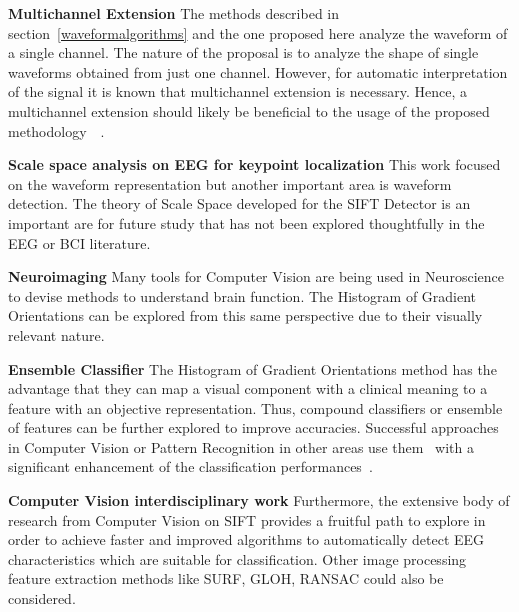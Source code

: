 \textbf{Multichannel Extension}
The methods described in section~\ref{waveformalgorithms} and the one proposed here analyze the waveform of a single channel.
The nature of the proposal is to analyze the shape of single waveforms obtained from just one channel.  %
However, for automatic interpretation of the signal it is known that multichannel extension is necessary.  Hence, a multichannel extension should likely be beneficial to the usage of the proposed methodology~~\cite{Gribonval2008}.

\textbf{Scale space analysis on EEG for keypoint localization}
This work focused on the waveform representation but another important area is waveform detection.  The theory of Scale Space developed for the SIFT Detector is an important are for future study that has not been explored thoughtfully in the EEG or BCI literature.


\textbf{Neuroimaging}
Many tools for Computer Vision are being used in Neuroscience to devise methods to understand brain function.  The Histogram of Gradient Orientations can be explored from this same perspective due to their visually relevant nature.

\textbf{Ensemble Classifier}
The Histogram of Gradient Orientations method has the advantage that they can map a visual component with a clinical meaning to a feature with an objective representation. Thus, compound classifiers or ensemble of features can be further explored to improve accuracies.  Successful approaches in Computer Vision or Pattern Recognition in other areas use them~\cite{Criminisi2013} with a significant enhancement of the classification performances~\cite{Gu2012}.

\textbf{Computer Vision interdisciplinary work}
Furthermore, the extensive body of research from Computer Vision on SIFT provides a fruitful path to explore in order to achieve faster and improved algorithms to automatically detect EEG characteristics which are suitable for classification. Other image processing feature extraction methods like SURF, GLOH, RANSAC could also be considered.

